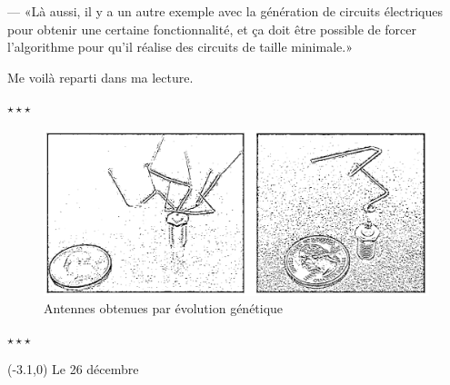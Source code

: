 \documentclass[letterpaper, 12pt]{report} %
\newcommand{\stardelimiter}{{\begin{center}\vspace{0.3cm} $\star \star \star$\vspace{0.25cm}\end{center}}}
\newcommand{\datemarge}[1]{%
    \begin{textblock}{3}(-3.1,0)
        {\color{blue}#1}
    \end{textblock}
}
\begin{document}
{--- «Là aussi, il y a un autre exemple avec la génération de circuits électriques pour obtenir une certaine fonctionnalité, et ça doit être possible de forcer l'algorithme pour qu'il réalise des circuits de taille minimale.»

Me voilà reparti dans ma lecture.

\vspace{-0.1cm}

\stardelimiter{}

\vspace{0.1cm}

\begin{figure}[h]
    \centering
    \includegraphics[width=13cm]{GeneticallyGrownAntennas_NASA-web.png} %
    \caption{Antennes obtenues par évolution génétique}
\end{figure}

\vspace{-1cm}

\stardelimiter{}


\newpage
\datemarge{Le 26 décembre}

}
\end{document}
